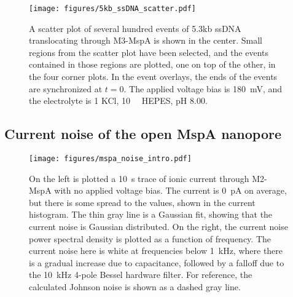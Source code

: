 \begin{figure}[h]
\begin{centering}
\texttt{[image: figures/5kb\_ssDNA\_scatter.pdf]}
\caption[Scatter plot of 5.3kb ssDNA in MspA]{A scatter plot of several hundred events of 5.3kb ssDNA translocating through M3-MspA is shown in the center.  Small regions from the scatter plot have been selected, and the events contained in those regions are plotted, one on top of the other, in the four corner plots.  In the event overlays, the ends of the events are synchronized at $t=0$.  The applied voltage bias is \SI{180}{\mV}, and the electrolyte is \SI{1}{\Molar} KCl, \SI{10}{\milli\Molar} HEPES, pH \num{8.00}.}
\label{fig:mspa_5kb_scatter}
\end{centering}
\end{figure}

\subsection{Current noise of the open MspA nanopore}

\begin{figure}[h]
\begin{centering}
\texttt{[image: figures/mspa\_noise\_intro.pdf]}
\caption[Current noise in the MspA nanopore]{On the left is plotted a \SI{10}{\s} trace of ionic current through M2-MspA with no applied voltage bias.  The current is \SI{0}{\pA} on average, but there is some spread to the values, shown in the current histogram.  The thin gray line is a Gaussian fit, showing that the current noise is Gaussian distributed.  On the right, the current noise power spectral density is plotted as a function of frequency.  The current noise here is white at frequencies below \SI{1}{\kHz}, where there is a gradual increase due to capacitance, followed by a falloff due to the \SI{10}{\kHz} 4-pole Bessel hardware filter.  For reference, the calculated Johnson noise is shown as a dashed gray line.}
\label{fig:mspa_noise_intro}
\end{centering}
\end{figure}